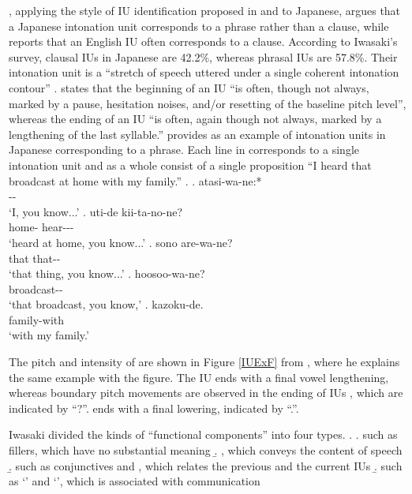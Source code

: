 ,
applying the style of IU identification proposed in  and   to Japanese,
argues that a Japanese intonation unit corresponds to a phrase rather than a clause,
while  reports that an English IU often corresponds to a clause.
According to Iwasaki's survey,
clausal IUs in Japanese are 42.2\%,
whereas phrasal IUs are 57.8\%.
Their intonation unit is a ``stretch of speech uttered under a single coherent intonation contour'' \cite[17]{duboisetal92}.
 states that
the beginning of an IU ``is often, though not always, marked by a pause, hesitation noises, and/or resetting of the baseline pitch level'',
whereas the ending of an IU ``is often, again though not always, marked by a lengthening of the last syllable.''
 provides \Next as an example of intonation units in Japanese corresponding to a phrase.
Each line in \Next corresponds to a single intonation unit
and \Next[a-e] as a whole consist of a single proposition
``I heard that broadcast at home with my family.''
%
\ex.
 \ag. atasi-wa-ne:* \\
      -- \\
      `I, you know...'
 \bg. uti-de kii-ta-no-ne? \\
      home- hear--- \\
      `heard at home, you know...'
 \bg. sono are-wa-ne? \\
      that that-- \\
      `that thing, you know...'
 \bg. hoosoo-wa-ne? \\
      broadcast-- \\
      `that broadcast, you know,'
 \bg. kazoku-de. \\
      family-with \\
      `with my family.'
 \hfill{\cite[40]{iwasaki93}}

The pitch and intensity of \Next are shown in Figure \ref{IUExF} from
,
where he explains the same example with the figure.
The IU \Next[a] ends with a final vowel lengthening,
whereas boundary pitch movements are observed in the ending of IUs \Next[b-d],
which are indicated by ``?''.
\Next[e] ends with a final lowering, indicated by ``.''.

Iwasaki divided the kinds of ``functional components'' into four types.
%
\ex.
 \a.  such as fillers, which have no substantial meaning
 \b. , which conveys the content of speech
 \b.  such as conjunctives and , which relates the previous and the current IUs
 \b.  such as  `' and  `', which is associated with communication

